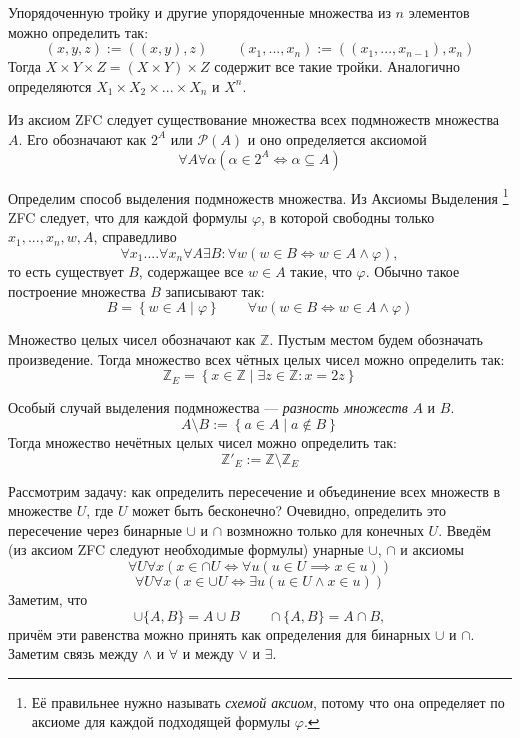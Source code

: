Упорядоченную тройку и другие упорядоченные множества из $n$ элементов
можно определить так:
\[
	(x,y,z):=((x,y),z)\qquad (x_1,...,x_{n}):=((x_1,...,x_{n-1}),x_{n})
\]
Тогда $X\times Y\times Z=(X\times Y)\times Z$ содержит все такие тройки.
Аналогично определяются $X_1\times X_2\times ...\times X_{n}$ и $X^{n}$.

Из аксиом ZFC следует существование множества всех подмножеств множества $A$.
Его обозначают как $2^{A}$ или $\mathcal P(A)$ и оно определяется аксиомой
\[
	\forall A\forall \alpha(\alpha\in 2^{A}\iff \alpha\subseteq A)
\]

Определим способ выделения подмножеств множества.
Из Аксиомы Выделения
\footnote{Её правильнее нужно называть {\it схемой аксиом},
потому что она определяет по аксиоме для каждой подходящей формулы $\varphi$.}
ZFC следует, что для каждой формулы $\varphi$, в которой свободны
только $x_1,...,x_{n},w,A$, справедливо
\[
	\forall x_1....\forall x_{n}\forall A\exists B:\forall w(w\in B\iff
	w\in A\land \varphi),
\]
то есть существует $B$, содержащее все $w\in A$ такие, что $\varphi$.
Обычно такое построение множества $B$ записывают так:
\[
	B=\left\{w\in A\;\big|\;\varphi\right\}\qquad
	\forall w(w\in B\iff w\in A\land \varphi)
\]

\newcommand\Z{\mathbb Z}
Множество целых чисел обозначают как $\Z$\index{множество!целых чисел, $\Z$}.
Пустым местом будем обозначать произведение. Тогда
множество всех чётных целых чисел можно определить так:
\[
	\Z_{E}=\left\{x\in\Z\;\big|\;\exists z\in\Z:x=2z\right\}
\]

Особый случай выделения подмножества --- {\it разность множеств} $A$ и $B$.
\[
	A\setminus B:=\left\{a\in A\;\big|\; a\notin B\right\}
\]
Тогда множество нечётных целых чисел можно определить так:
\[
	\Z'_{E}:=\Z\setminus \Z_E
\]

Рассмотрим задачу: как определить пересечение и объединение
всех множеств в множестве $U$, где $U$ может быть бесконечно?
Очевидно, определить это пересечение через бинарные $\cup$ и $\cap$
возмножно только для конечных $U$.
Введём (из аксиом ZFC следуют необходимые формулы) унарные $\cup$, $\cap$
и аксиомы
\[
	\forall U\forall x(x\in \cap U\iff \forall u(u\in U\implies x\in u))
\]
\[
	\forall U\forall x(x\in \cup U\iff \exists u(u\in U\land x\in u))
\]
Заметим, что
\[
	\cup \{A,B\}=A\cup B\qquad \cap \{A,B\}=A\cap B,
\]
причём эти равенства можно принять как определения для бинарных $\cup$ и $\cap$.
Заметим связь между $\land$ и $\forall$ и между $\lor$ и $\exists$.

